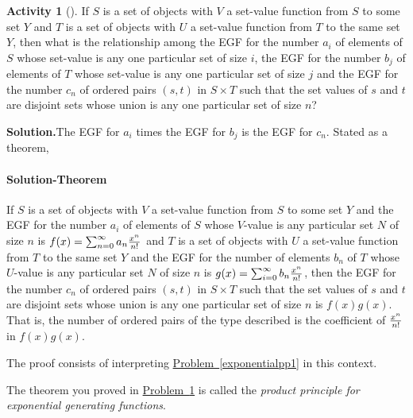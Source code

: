 \documentclass[10pt,]{book}
\theoremstyle{plain}
\theoremstyle{definition}
\newtheorem{activity}[project]{Activity}
\numberwithin{equation}{chapter}
\begin{document}
\begin{activity}[]\label{exponentialpp3}
If \(S\) is a set of objects with \(V\) a set-value function from \(S\) to some set \(Y\) and \(T\) is a set of objects with \(U\) a set-value function from \(T\) to the same set \(Y\), then what is the relationship among the EGF for the number \(a_i\) of elements of \(S\) whose set-value is any one particular set of size \(i\), the EGF for the number \(b_j\) of elements of \(T\) whose set-value is any one particular set of size \(j\) and the EGF for the number \(c_n\) of ordered pairs \((s,t)\) in \(S\times
T\) such that the set values of \(s\) and \(t\) are disjoint sets whose union is any one particular set of size \(n\)?%
\par\medskip\noindent%
\textbf{Solution.}\quad The EGF for \(a_i\) times the EGF for \(b_j\) is the EGF for \(c_n\). Stated as a theorem,%
\typeout{************************************************}
\typeout{************************************************}
\paragraph[{Solution-Theorem}]{Solution-Theorem}\hypertarget{paragraphs-1}{}
If \(S\) is a set of objects with \(V\) a set-value function from \(S\) to some set \(Y\) and the EGF for the number \(a_i\) of elements of \(S\) whose \(V\)-value is any particular set \(N\) of size \(n\) is \(f(x)=\sum_{n=0}^\infty
a_n{x^n\over n!}\) and \(T\) is a set of objects with \(U\) a set-value function from \(T\) to the same set \(Y\) and the EGF for the number of elements \(b_n\) of \(T\) whose \(U\)-value is any particular set \(N\) of size \(n\) is \(g(x) = \sum_{i=0}^\infty b_n{x^n\over n!}\), then the EGF for the number \(c_n\) of ordered pairs \((s,t)\) in \(S\times T\) such that the set values of \(s\) and \(t\) are disjoint sets whose union is any one particular set of size \(n\) is \(f(x)g(x)\). That is, the number of ordered pairs of the type described is the coefficient of \(x^n\over n!\) in \(f(x)g(x)\).%
\par
The proof consists of interpreting \hyperref[exponentialpp1]{Problem~\ref{exponentialpp1}} in this context.%
\end{activity}
The theorem you proved in \hyperref[exponentialpp3]{Problem~\ref{exponentialpp3}} is called the \emph{product principle for exponential generating functions}.%
\end{document}
